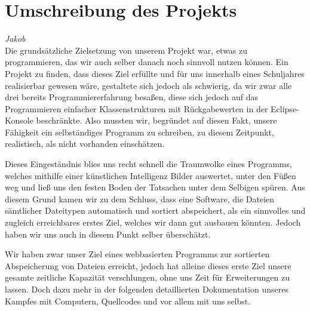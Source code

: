 \documentclass[12pt,a4paper,bibliography=totocnumbered,listof=totocnumbered]{scrartcl}
\begin{document}
\section{Umschreibung des Projekts}
\emph{Jakob}
\\
Die grundsätzliche Zielsetzung von unserem Projekt war, etwas zu programmieren, das
wir auch selber danach noch sinnvoll nutzen können.
Ein Projekt zu finden, dass dieses Ziel erfüllte und für uns innerhalb eines Schuljahres realisierbar gewesen wäre, gestaltete sich jedoch als schwierig, da wir zwar alle drei bereits Programmiererfahrung besaßen, diese sich jedoch auf das Programmieren einfacher Klassenstrukturen mit Rückgabewerten in der Eclipse-Konsole
beschränkte.
Also mussten wir, begründet auf diesen Fakt, unsere Fähigkeit ein selbständiges Programm zu schreiben, zu diesem Zeitpunkt, realistisch, als nicht vorhanden einschätzen.

Dieses Eingeständnis blies uns recht schnell die Traumwolke eines Programms, welches mithilfe einer künstlichen Intelligenz Bilder auswertet, unter den Füßen weg und ließ uns den festen Boden der Tatsachen unter dem Selbigen spüren.
Aus diesem Grund kamen wir zu dem Schluss, dass eine Software, die Dateien sämtlicher Dateitypen automatisch und sortiert abspeichert, als ein sinnvolles und zugleich erreichbares erstes Ziel, welches wir dann gut ausbauen könnten.
Jedoch haben wir uns auch in diesem Punkt selber überschätzt.

Wir haben zwar unser Ziel eines webbasierten Programms zur sortierten Abspeicherung von Dateien erreicht, jedoch hat alleine dieses \glqq erste Ziel\grqq{} unsere gesamte zeitliche Kapazität verschlungen, ohne uns Zeit für Erweiterungen zu lassen.
Doch dazu mehr in der folgenden detaillierten Dokumentation unseres Kampfes mit Computern, Quellcodes und vor allem mit uns selbst.

\vspace{-1,2em}

\pagebreak

\renewcommand{\cfttabpresnum}{Tab. }
\renewcommand{\cftfigpresnum}{Abb. }
\settowidth{\cfttabnumwidth}{Abb. 10\quad}
\settowidth{\cftfignumwidth}{Abb. 10\quad}
\end{document}
